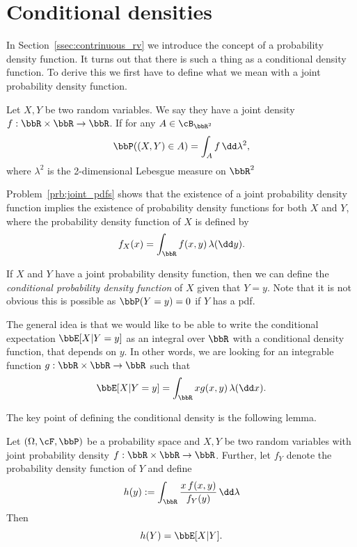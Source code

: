 \section{Conditional densities}

In Section~\ref{ssec:contrinuous_rv} we introduce the concept of a probability density function. It turns out that there is such a thing as a conditional density function. To derive this we first have to define what we mean with a joint probability density function.

\begin{definition}\label{def:joint_pdf}
Let $X,Y$ be two random variables. We say they have a joint density $f : \bbR \times \bbR \to \bbR$. If for any $A \in \cB_{\bbR^2}$
\[
	\bbP((X,Y) \in A) = \int_A f \, \dd \lambda^2,
\]
where $\lambda^2$ is the 2-dimensional Lebesgue measure on $\bbR^2$
\end{definition}

Problem~\ref{prb:joint_pdfs} shows that the existence of a joint probability density function implies the existence of probability density functions for both $X$ and $Y$, where the probability density function of $X$ is defined by
\[
	f_X(x) = \int_\bbR f(x,y) \, \lambda(\dd y).
\] 

If $X$ and $Y$ have a joint probability density function, then we can define the \emph{conditional probability density function} of $X$ given that $Y = y$. Note that it is not obvious this is possible as $\bbP(Y = y) = 0$ if $Y$ has a pdf. 

The general idea is that we would like to be able to write the conditional expectation $\bbE[X | Y = y]$ as an integral over $\bbR$ with a conditional density function, that depends on $y$. In other words, we are looking for an integrable function $g : \bbR \times \bbR \to \bbR$ such that
\[
	\bbE[X | Y = y] = \int_\bbR x g(x,y) \, \lambda (\dd x).
\]


The key point of defining the conditional density is the following lemma.


\begin{lemma}\label{lem:condition_expectation_Y_y}
Let $(\Omega, \cF, \bbP)$ be a probability space and $X,Y$ be two random variables with joint probability density $f : \bbR \times \bbR \to \bbR$. Further, let $f_Y$ denote the probability density function of $Y$ and define
\[
	h(y) := \int_\bbR \frac{x \, f(x,y)}{f_Y(y)} \, \dd \lambda
\]
Then
\[
	h(Y) = \bbE[X | Y].
\]
\end{lemma}

